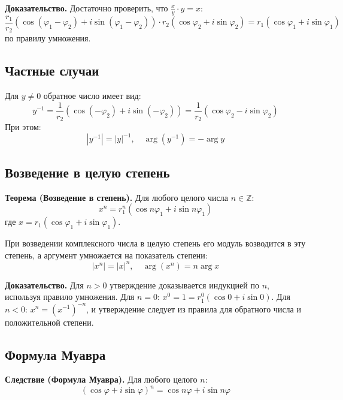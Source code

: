 \documentclass[a4paper,12pt]{article}
\theoremstyle{definition}
\theoremstyle{plain}
\theoremstyle{remark}
\begin{document}
	\medskip
	\noindent \textbf{Доказательство.}
	Достаточно проверить, что $\frac{x}{y} \cdot y = x$:
	\[
	\frac{r_1}{r_2} (\cos(\varphi_1 - \varphi_2) + i \sin(\varphi_1 - \varphi_2)) \cdot r_2 (\cos \varphi_2 + i \sin \varphi_2) = r_1 (\cos \varphi_1 + i \sin \varphi_1)
	\]
	по правилу умножения.
	
	\subsection{Частные случаи}
	
	\begin{tcolorbox}[colback=gray!5, colframe=gray!50, title=Обратное число]
		Для $y \neq 0$ обратное число имеет вид:
		\[
		y^{-1} = \frac{1}{r_2} (\cos(-\varphi_2) + i \sin(-\varphi_2)) = \frac{1}{r_2} (\cos \varphi_2 - i \sin \varphi_2)
		\]
		При этом:
		\[
		|y^{-1}| = |y|^{-1},\quad \arg(y^{-1}) = -\arg y
		\]
	\end{tcolorbox}
	
	\subsection{Возведение в целую степень}
	
	\noindent \textbf{Теорема (Возведение в степень).}
	Для любого целого числа $n \in \mathbb{Z}$:
	\[
	x^n = r_1^n (\cos n\varphi_1 + i \sin n\varphi_1)
	\]
	где $x = r_1(\cos \varphi_1 + i \sin \varphi_1)$.
	
	\begin{tcolorbox}[colback=red!5, colframe=red!70!black, title=Правило возведения в степень]
		При возведении комплексного числа в целую степень его модуль возводится в эту степень, а аргумент умножается на показатель степени:
		\[
		|x^n| = |x|^n,\quad \arg(x^n) = n \arg x
		\]
	\end{tcolorbox}
	
	\medskip
	\noindent \textbf{Доказательство.}
	Для $n > 0$ утверждение доказывается индукцией по $n$, используя правило умножения. Для $n = 0$: $x^0 = 1 = r_1^0(\cos 0 + i \sin 0)$. Для $n < 0$: $x^n = (x^{-1})^{-n}$, и утверждение следует из правила для обратного числа и положительной степени.
	
	\subsection{Формула Муавра}
	
	\noindent \textbf{Следствие (Формула Муавра).}
	Для любого целого $n$:
	\[
	(\cos \varphi + i \sin \varphi)^n = \cos n\varphi + i \sin n\varphi
	\]
	
\end{document}
